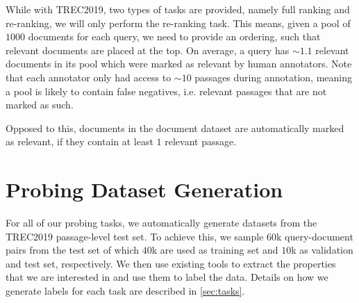 While with TREC2019, two types of tasks are provided, namely full ranking and re-ranking, we will only perform the re-ranking task. This means, given a pool of $1000$ documents for each query, we need to provide an ordering, such that relevant documents are placed at the top. On average, a query has $\sim 1.1$ relevant documents in its pool which were marked as relevant by human annotators. Note that each annotator only had access to $\sim 10$ passages during annotation, meaning a pool is likely to contain false negatives, i.e. relevant passages that are not marked as such.

Opposed to this, documents in the document dataset are automatically marked as relevant, if they contain at least $1$ relevant passage.

\section{Probing Dataset Generation}
\label{sec:dataset_gen}
For all of our probing tasks, we automatically generate datasets from the TREC2019 passage-level test set. To achieve this, we sample $60$k query-document pairs from the test set of which $40$k are used as training set and $10$k as validation and test set, respectively. We then use existing tools to extract the properties that we are interested in and use them to label the data. Details on how we generate labels for each task are described in \autoref{sec:tasks}.



